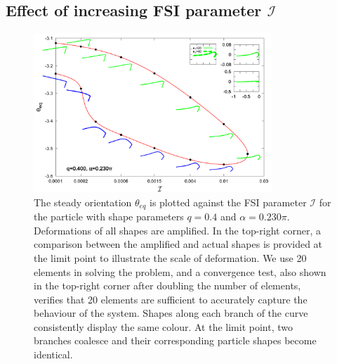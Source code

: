 \documentclass[a4paper,12pt]{report}
\begin{document}
\subsection{Effect of increasing FSI parameter $\mathcal{I}$}
\begin{figure}[!h]
	\begin{center}
		\includegraphics[width=0.8\textwidth]{plot/combine_elastic_beam_I_theta_q_0.40_alpha_0.230pi_initial_-4.80_paper.png}
		\caption{The steady orientation $\theta_{eq}$ is plotted against the FSI parameter $\mathcal{I}$ for the particle with shape parameters $q = 0.4$ and $\alpha = 0.230\pi$. Deformations of all shapes are amplified. In the top-right corner, a comparison between the amplified and actual shapes is provided at the limit point to illustrate the scale of deformation. We use 20 elements in solving the problem, and a convergence test, also shown in the top-right corner after doubling the number of elements, verifies that 20 elements are sufficient to accurately capture the behaviour of the system. Shapes along each branch of the curve consistently display the same colour. At the limit point, two branches coalesce and their corresponding particle shapes become identical.}
		\label{fig:7}
	\end{center}
\end{figure}
\end{document}
